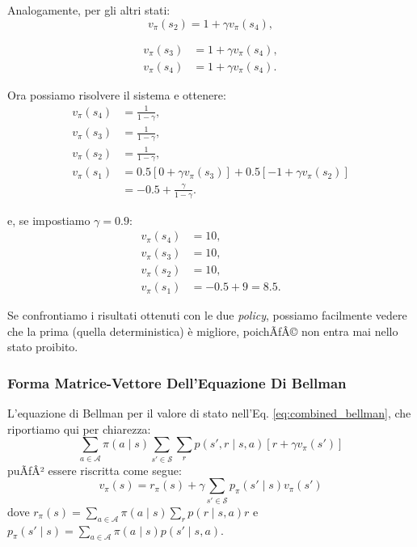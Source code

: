 ﻿\documentclass[11pt, a4paper]{report}
\begin{document}
Analogamente, per gli altri stati:
\[ v_\pi(s_2) = 1 + \gamma v_\pi(s_4), \]

\newpage

\begin{equation}
\begin{aligned}
v_\pi(s_3) &= 1 + \gamma v_\pi(s_4), \\
v_\pi(s_4) &= 1 + \gamma v_\pi(s_4).
\end{aligned}
\end{equation}

Ora possiamo risolvere il sistema e ottenere:
\begin{equation}
\begin{aligned}
v_\pi(s_4) &= \frac{1}{1 - \gamma}, \\
v_\pi(s_3) &= \frac{1}{1 - \gamma}, \\
v_\pi(s_2) &= \frac{1}{1 - \gamma}, \\
v_\pi(s_1) &= 0.5 [0 + \gamma v_\pi(s_3)] + 0.5 [-1 + \gamma v_\pi(s_2)] \\
&= -0.5 + \frac{\gamma}{1 - \gamma}.
\end{aligned}
\end{equation}

e, se impostiamo $\gamma = 0.9$:
\begin{equation}
\begin{aligned}
v_\pi(s_4) &= 10, \\
v_\pi(s_3) &= 10, \\
v_\pi(s_2) &= 10, \\
v_\pi(s_1) &= -0.5 + 9 = 8.5.
\end{aligned}
\end{equation}

Se confrontiamo i risultati ottenuti con le due \emph{policy}, possiamo facilmente vedere che la prima (quella deterministica) è migliore, poichÃƒÂ© non entra mai nello stato proibito.

\subsubsection{Forma Matrice-Vettore Dell'Equazione Di Bellman}

L'equazione di Bellman per il valore di stato nell'Eq. \eqref{eq:combined_bellman}, che riportiamo qui per chiarezza:
\[ \sum_{a \in \mathcal{A}} \pi(a \mid s) \sum_{s' \in \mathcal{S}} \sum_r p(s', r \mid s, a) [r + \gamma v_\pi(s')] \]
puÃƒÂ² essere riscritta come segue:
\begin{equation}
v_\pi(s) = r_\pi(s) + \gamma \sum_{s' \in \mathcal{S}} p_\pi(s' \mid s) v_\pi(s')
\end{equation}
dove $r_\pi(s) = \sum_{a \in \mathcal{A}} \pi(a \mid s) \sum_r p(r \mid s, a)r$ e $p_\pi(s' \mid s) = \sum_{a \in \mathcal{A}} \pi(a \mid s) p(s' \mid s, a)$.
\end{document}
